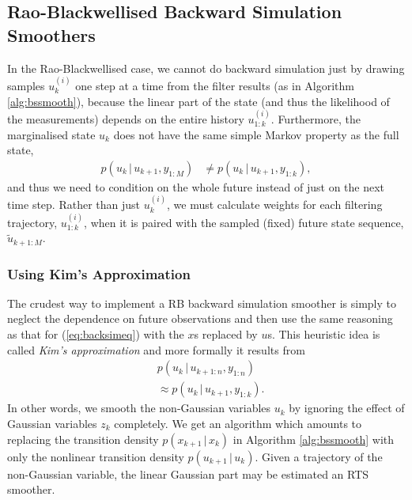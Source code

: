 \documentclass[twocolumn]{autart}    %
\begin{document}
\subsection{Rao-Blackwellised Backward Simulation Smoothers}
%
In the Rao-Blackwellised case, we cannot do backward simulation just by drawing samples $u_k^{(i)}$ one step at a time from the filter results (as in Algorithm \ref{alg:bssmooth}), because the linear part of the state (and thus the likelihood of the measurements) depends on the entire history $u^{(i)}_{1:k}$. Furthermore, the marginalised state $u_k$ does not have the same simple Markov property as the full state,
%
\begin{equation}
  \begin{split}
    p(u_{k}\,|\,u_{k+1},y_{1:M})
    &\ne p(u_{k}\,|\,u_{k+1},y_{1:k}),
  \end{split}
  \nonumber
\end{equation}
%
and thus we need to condition on the whole future instead of just on
the next time step. Rather than just $u^{(i)}_{k}$, we must calculate weights for each filtering
trajectory, $u^{(i)}_{1:k}$, when it is paired with the sampled
(fixed) future state sequence, $\tilde{u}_{k+1:M}$.

\subsubsection{Using Kim's Approximation}
%
The crudest way to implement a RB backward simulation smoother is simply to neglect the dependence on future observations and then use the same reasoning as that for (\ref{eq:backsimeq}) with the $x$s replaced by $u$s. This heuristic idea is called {\em Kim's approximation} \cite{Kim:1994,Barber:2006} and more formally it results from
%
\begin{equation}
\begin{split}
 &p(u_{k} \,|\, u_{k+1:n},y_{1:n}) \\
  &\approx p(u_{k} \,|\, u_{k+1},y_{1:k}).
\end{split}
\end{equation}
%
In other words, we smooth the non-Gaussian variables $u_k$ by ignoring the effect of Gaussian variables $z_k$ completely. We get an algorithm which amounts to replacing the transition density $p(x_{k+1}\,|\,x_{k})$ in Algorithm \ref{alg:bssmooth} with only the nonlinear transition density $p(u_{k+1}\,|\,u_{k})$. Given a trajectory of the non-Gaussian variable, the linear Gaussian part may be estimated an RTS smoother.
\end{document}
